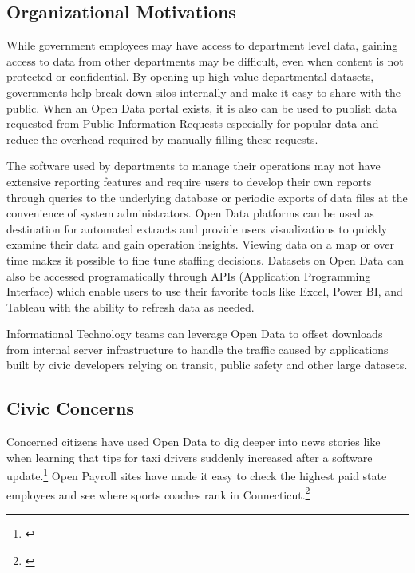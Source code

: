 \documentclass[
  openany]{book}
\begin{document}
\hypertarget{organizational-motivations}{%
\subsection{Organizational Motivations}\label{organizational-motivations}}

While government employees may have access to department level data, gaining access to data from other departments may be difficult, even when content is not protected or confidential. By opening up high value departmental datasets, governments help break down silos internally and make it easy to share with the public. When an Open Data portal exists, it is also can be used to publish data requested from Public Information Requests especially for popular data and reduce the overhead required by manually filling these requests.

The software used by departments to manage their operations may not have extensive reporting features and require users to develop their own reports through queries to the underlying database or periodic exports of data files at the convenience of system administrators. Open Data platforms can be used as destination for automated extracts and provide users visualizations to quickly examine their data and gain operation insights. Viewing data on a map or over time makes it possible to fine tune staffing decisions. Datasets on Open Data can also be accessed programatically through APIs (Application Programming Interface) which enable users to use their favorite tools like Excel, Power BI, and Tableau with the ability to refresh data as needed.

Informational Technology teams can leverage Open Data to offset downloads from internal server infrastructure to handle the traffic caused by applications built by civic developers relying on transit, public safety and other large datasets.

\hypertarget{civic-concerns}{%
\subsection{Civic Concerns}\label{civic-concerns}}

Concerned citizens have used Open Data to dig deeper into news stories like when learning that tips for taxi drivers suddenly increased after a software update.\footnote{\citet{iquantny2020}} Open Payroll sites have made it easy to check the highest paid state employees and see where sports coaches rank in Connecticut.\footnote{\citet{ctpayroll2019}}
\end{document}

